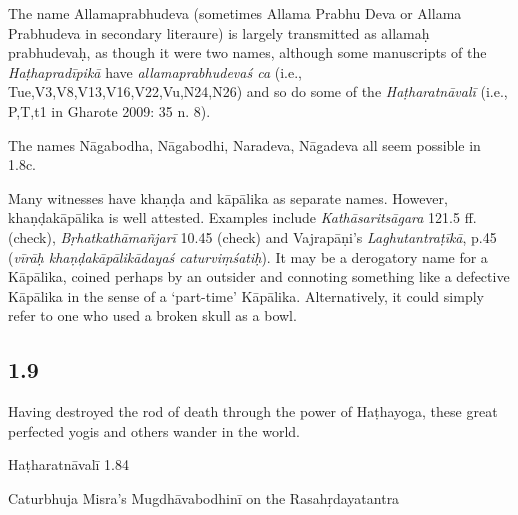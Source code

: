 \begin{ekdosis}
\begin{testimonia}[hp01_008]
\end{testimonia}

\begin{philcomm}[hp01_008]  
The name Allamaprabhudeva (sometimes Allama Prabhu Deva or Allama Prabhudeva in secondary literaure) is largely transmitted as allamaḥ prabhudevaḥ, as though it were two names, although some manuscripts of the \emph{Haṭhapradīpikā} have \emph{allamaprabhudevaś ca} (i.e., Tue,V3,V8,V13,V16,V22,Vu,N24,N26) and so do some of the \emph{Haṭharatnāvalī} (i.e., P,T,t1 in Gharote 2009: 35 n. 8).

The names Nāgabodha, Nāgabodhi, Naradeva, Nāgadeva all seem possible in 1.8c. 

Many witnesses have khaṇḍa and kāpālika as separate names. However, khaṇḍakāpālika is well attested. Examples include \emph{Kathāsaritsāgara} 121.5 ff. (check), \emph{Bṛhatkathāmañjarī} 10.45 (check) and Vajrapāṇi’s \emph{Laghutantraṭīkā}, p.45 (\emph{vīrāḥ khaṇḍakāpālikādayaś caturviṃśatiḥ}). It may be a derogatory name for a Kāpālika, coined perhaps by an outsider and connoting something like a defective Kāpālika in the sense of a `part-time' Kāpālika. Alternatively, it could simply refer to one who used a broken skull as a bowl.
\end{philcomm}

\subsection*{1.9}
\begin{translation}[hp01_009]
Having destroyed the rod of death through the power of Haṭhayoga, these great perfected yogis and others wander in the world.
\end{translation}

\begin{testimonia}[hp01_009]
Haṭharatnāvalī 1.84

\begin{versinnote}
\end{versinnote}

Caturbhuja Misra's Mugdhāvabodhinī on the Rasahṛdayatantra

\begin{versinnote}
\end{versinnote}


\end{testimonia}
\end{ekdosis}

